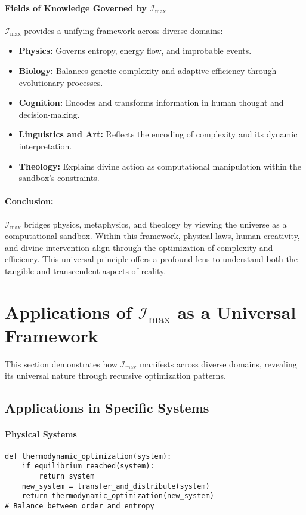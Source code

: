 \documentclass[12pt]{article}
\begin{document}
\paragraph{Fields of Knowledge Governed by \(\mathcal{I}_{\text{max}}\)}
\(\mathcal{I}_{\text{max}}\) provides a unifying framework across diverse domains:
\begin{itemize}
    \item \textbf{Physics:} Governs entropy, energy flow, and improbable events.
    \item \textbf{Biology:} Balances genetic complexity and adaptive efficiency through evolutionary processes.
    \item \textbf{Cognition:} Encodes and transforms information in human thought and decision-making.
    \item \textbf{Linguistics and Art:} Reflects the encoding of complexity and its dynamic interpretation.
    \item \textbf{Theology:} Explains divine action as computational manipulation within the sandbox's constraints.
\end{itemize}

\paragraph{Conclusion:}
\(\mathcal{I}_{\text{max}}\) bridges physics, metaphysics, and theology by viewing the universe as a computational sandbox. Within this framework, physical laws, human creativity, and divine intervention align through the optimization of complexity and efficiency. This universal principle offers a profound lens to understand both the tangible and transcendent aspects of reality.


\section{Applications of $\mathcal{I}_{\text{max}}$ as a Universal Framework}

This section demonstrates how $\mathcal{I}_{\text{max}}$ manifests across diverse domains, revealing its universal nature through recursive optimization patterns.

\subsection{Applications in Specific Systems}

\paragraph{Physical Systems}
\begin{verbatim}
def thermodynamic_optimization(system):
    if equilibrium_reached(system):
        return system
    new_system = transfer_and_distribute(system)
    return thermodynamic_optimization(new_system)
# Balance between order and entropy
\end{verbatim}
\end{document}
